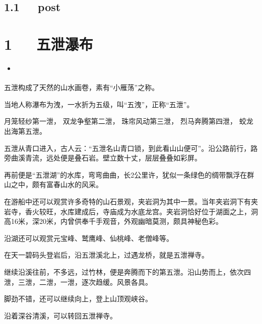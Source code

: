 \documentclass[letterpaper,10pt,english]{sphinxmanual}
\begin{document}
\section{1.1   post}
\label{\detokenize{p03_u65c5_u6e38/Hello_uff0cp03_u65c5_u6e38:post}}

\chapter{1   五泄瀑布}
\label{\detokenize{p03_u65c5_u6e38/_u4e94_u6cc4_u7011_u5e03:id1}}\label{\detokenize{p03_u65c5_u6e38/_u4e94_u6cc4_u7011_u5e03::doc}}
\begin{sphinxShadowBox}
\begin{itemize}
\item {} 
\label{\detokenize{p03_u65c5_u6e38/_u4e94_u6cc4_u7011_u5e03:id3}}{\hyperref[\detokenize{p03_u65c5_u6e38/_u4e94_u6cc4_u7011_u5e03:id1}]{}}

\end{itemize}
\end{sphinxShadowBox}

五泄构成了天然的山水画卷，素有“小雁荡”之称。

当地人称瀑布为洩，一水折为五级，叫“五洩”，正称“五泄”。

月笼轻纱第一泄，
双龙争壑第二泄，
珠帘风动第三泄，
烈马奔腾第四泄，
蛟龙出海第五泄。

五泄从青口进入，古人云：“五泄名山青口锁，到此看山山便可”。沿公路前行，路旁曲溪青流，远处便是叠石岩。壁立数十丈，层层叠叠如彩屏。

再前便是“五泄湖”的水库，弯弯曲曲，长2公里许，犹似一条绿色的绸带飘浮在群山之中，颇有富春山水的风采。

在游船中还可以观赏许多奇特的山石景观，夹岩洞为其中一景。当年夹岩洞下有夹岩寺，香火较旺，水库建成后，寺庙成为水底龙宫。夹岩洞恰好位于湖面之上，洞高16米，深20米，内曾供奉千手观音，外观幽暗莫测，颇具神秘色彩。

沿湖还可以观赏元宝峰、鹫鹰峰、仙桃峰、老僧峰等。

在天一碧码头登岩后，沿五泄溪北上，过遇龙桥，就是五泄禅寺。

继续沿溪往前，不多远，过竹林，便是奔腾而下的第五泄。沿山势而上，依次四泄，三泄，二泄，一泄，逐次趋缓。风景各具。

脚劲不错，还可以继续向上，登上山顶观峡谷。

沿着深谷清溪，可以转回五泄禅寺。
\end{document}
